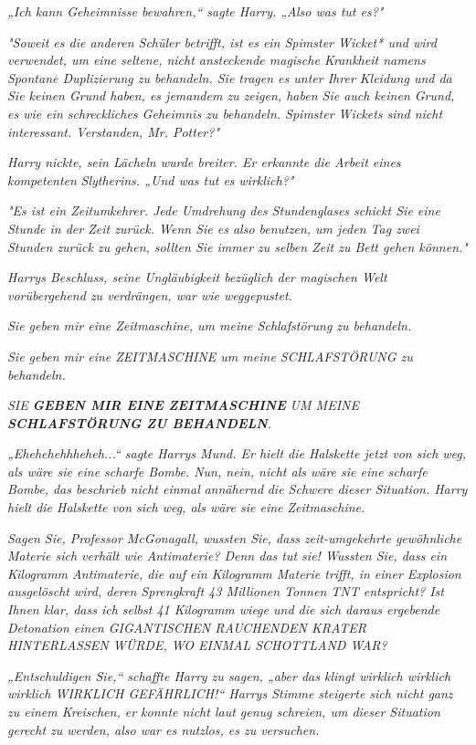 {\emph{„Ich kann Geheimnisse bewahren,“ sagte Harry. „Also was tut es?"}

\emph{"Soweit es die anderen Schüler betrifft, ist es ein Spimster Wicket* und wird verwendet, um eine seltene, nicht ansteckende magische Krankheit namens Spontane Duplizierung zu behandeln. Sie tragen es unter Ihrer Kleidung und da Sie keinen Grund haben, es jemandem zu zeigen, haben Sie auch keinen Grund, es wie ein schreckliches Geheimnis zu behandeln. Spimster Wickets sind nicht interessant. Verstanden, Mr. Potter?"}

\emph{Harry nickte, sein Lächeln wurde breiter. Er erkannte die Arbeit eines} \emph{\emph{kompetenten}} \emph{Slytherins. „Und was tut es} \emph{\emph{wirklich?}"}

\emph{"Es ist ein Zeitumkehrer. Jede Umdrehung des Stundenglases schickt Sie eine Stunde in der Zeit zurück. Wenn Sie es also benutzen, um jeden Tag zwei Stunden zurück zu gehen, sollten Sie immer zu selben Zeit zu Bett gehen können."}

\emph{Harrys Beschluss, seine Ungläubigkeit bezüglich der magischen Welt vorübergehend zu verdrängen, war wie weggepustet.}

\emph{\emph{Sie geben mir eine Zeitmaschine, um meine Schlafstörung zu behandeln.}}

\emph{\emph{Sie geben mir eine ZEITMASCHINE um meine SCHLAFSTÖRUNG zu behandeln.}}

\emph{\emph{SIE}} \emph{\textbf{\emph{GEBEN MIR EINE ZEITMASCHINE}}} \emph{\emph{UM MEINE}} \emph{\textbf{\emph{SCHLAFSTÖRUNG ZU BEHANDELN}}\emph{.}}

\emph{„Ehehehehhheheh...“ sagte Harrys Mund. Er hielt die Halskette jetzt von sich weg, als wäre sie eine scharfe Bombe. Nun, nein, nicht als wäre sie eine scharfe Bombe, das beschrieb nicht einmal} \emph{\emph{annähernd}} \emph{die Schwere dieser Situation. Harry hielt die Halskette von sich weg, als wäre sie eine Zeitmaschine.}

\emph{\emph{Sagen Sie, Professor McGonagall, wussten Sie, dass zeit-umgekehrte gewöhnliche Materie sich verhält wie Antimaterie? Denn das tut sie! Wussten Sie, dass ein Kilogramm Antimaterie, die auf ein Kilogramm Materie trifft, in einer Explosion ausgelöscht wird, deren Sprengkraft 43 Millionen Tonnen TNT entspricht? Ist Ihnen klar, dass ich selbst 41 Kilogramm wiege und die sich daraus ergebende Detonation einen GIGANTISCHEN RAUCHENDEN KRATER HINTERLASSEN WÜRDE, WO EINMAL SCHOTTLAND WAR?}}

\emph{„Entschuldigen Sie,“ schaffte Harry zu sagen, „aber das klingt wirklich wirklich} \emph{\emph{wirklich WIRKLICH GEFÄHRLICH!}“ Harrys Stimme steigerte sich nicht ganz zu einem Kreischen, er konnte nicht laut genug schreien, um dieser Situation gerecht zu werden, also war es nutzlos, es zu versuchen.}

}
